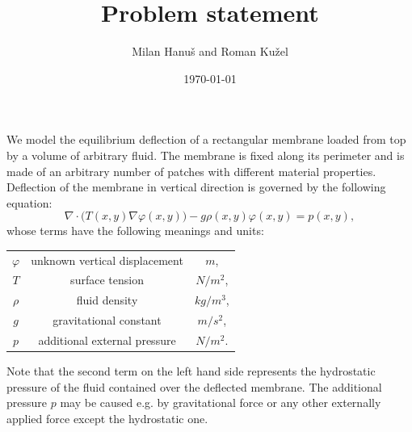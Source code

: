 \documentclass{article}
\title{Problem statement}
\author{Milan Hanu{\v s} and Roman Ku{\v z}el}
\date{\today}
\begin{document}
\maketitle
  We model the equilibrium deflection of a rectangular membrane loaded from top by a volume of arbitrary fluid. The membrane is fixed along its perimeter and is made of an arbitrary number of patches with different material properties. Deflection of the membrane in vertical direction is governed by the following equation:
$$  
\nabla\cdot \bigl( T(x,y) \nabla \varphi(x,y) \bigr) - g\rho(x,y)\varphi(x,y) = p(x,y),
$$
whose terms have the following meanings and units: 
\begin{center}
   \begin{tabular}{ccc}
  		$\varphi$ & unknown vertical displacement & $m$, \\
  		$T$ & surface tension & $N/m^2$,   \\
  		$\rho$ & fluid density & $kg/m^3$, \\
  		$g$ & gravitational constant & $m/s^2$, \\
  		$p$ & additional external pressure & $N/m^2$.
  \end{tabular}
\end{center}
Note that the second term on the left hand side represents the hydrostatic pressure of the fluid contained over the deflected membrane. The additional pressure $p$ may be caused e.g. by gravitational force or any other externally applied force except the hydrostatic one.\\[.2em]
\end{document}

